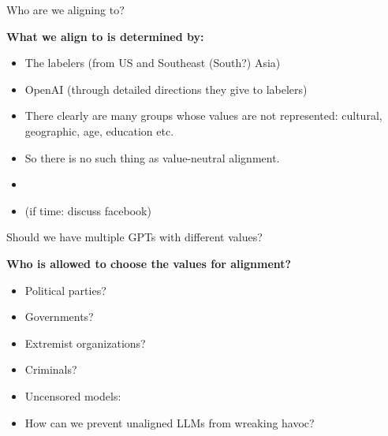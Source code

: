 \begin{vbframe}{Who are we aligning to?}

\vfill

\textbf{What we align to is determined by:}

	\begin{itemize}
		\item The labelers (from US and Southeast
		(South?) Asia)
		\item OpenAI (through detailed directions
		they give to labelers)
                \item There clearly are many groups whose
		values are not represented: cultural,
		geographic, age, education etc.
                \item So there is no such thing as
		value-neutral alignment.
                \item {}
\item (if time: discuss facebook)
	\end{itemize}

\vfill

\end{vbframe}

\begin{vbframe}{Should we have multiple GPTs with different values?}

\vfill

\textbf{Who is allowed to choose the values for alignment?}

	\begin{itemize}
		\item Political parties?
		\item Governments?
		\item Extremist organizations?
                \item Criminals?
                \item Uncensored models:
                \href{https://erichartford.com}{}
                \item \ques How can we prevent unaligned
		LLMs from wreaking havoc?
	\end{itemize}

\vfill

\end{vbframe}




